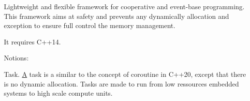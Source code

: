 Lightweight and flexible framework for cooperative and event-\/base programming. This framework aims at safety and prevents any dynamically allocation and exception to ensure full control the memory management.

It requires C++14.

Notions\+:
\begin{DoxyItemize}
\item Task. \hyperlink{classA}{A} task is a similar to the concept of coroutine in C++20, except that there is no dynamic allocation. Tasks are made to run from low ressources embedded systems to high scale compute units. 
\end{DoxyItemize}